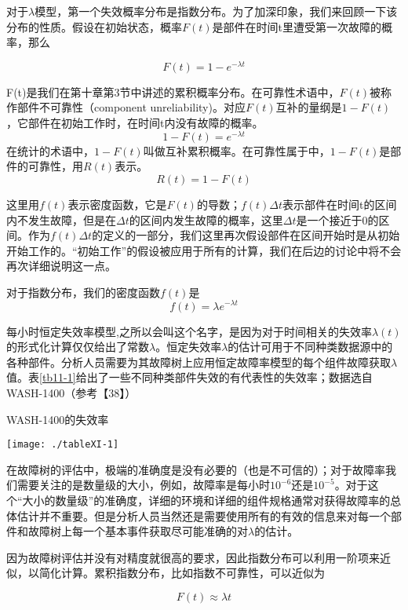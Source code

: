 \documentclass[cn,11pt,chinese]{elegantbook}
\begin{document}
{对于$\lambda$模型，第一个失效概率分布是指数分布。为了加深印象，我们来回顾一下该分布的性质。假设在初始状态，概率$F(t)$是部件在时间t里遭受第一次故障的概率，那么

\begin{equation}\label{eq11-1}
F(t)=1-e^{-\lambda t}
\end{equation}

F(t)是我们在第十章第3节中讲述的累积概率分布。在可靠性术语中，$F(t)$被称作部件不可靠性（component unreliability)。对应$F(t)$互补的量纲是$1-F(t)$，它部件在初始工作时，在时间t内没有故障的概率。
$$1-F(t)=e^{-\lambda t}$$
在统计的术语中，$1-F(t)$叫做互补累积概率。在可靠性属于中，$1-F(t)$是部件的可靠性，用$R(t)$表示。
$$R(t)=1-F(t)$$

这里用$f(t)$表示密度函数，它是$F(t)$的导数；$f(t)\Delta t$表示部件在时间t的区间内不发生故障，但是在$\Delta t$的区间内发生故障的概率，这里$\Delta t$是一个接近于0的区间。作为$f(t)\Delta t$的定义的一部分，我们这里再次假设部件在区间开始时是从初始开始工作的。“初始工作”的假设被应用于所有的计算，我们在后边的讨论中将不会再次详细说明这一点。

对于指数分布，我们的密度函数$f(t)$是
$$f(t)=\lambda e^{-\lambda t}$$

每小时恒定失效率模型,之所以会叫这个名字，是因为对于时间相关的失效率$\lambda(t)$的形式化计算仅仅给出了常数$\lambda$。恒定失效率$\lambda$的估计可用于不同种类数据源中的各种部件。分析人员需要为其故障树上应用恒定故障率模型的每个组件故障获取$\lambda$值。表\ref{tb11-1}给出了一些不同种类部件失效的有代表性的失效率；数据选自WASH-1400（参考【38】）

\begin{table}
	\caption{WASH-1400的失效率}\label{tb11-1}
	\texttt{[image: ./tableXI-1]}
\end{table}

在故障树的评估中，极端的准确度是没有必要的（也是不可信的）；对于故障率我们需要关注的是数量级的大小，例如，故障率是每小时$10^{-6}$还是$10^{-5}$。对于这个“大小的数量级”的准确度，详细的环境和详细的组件规格通常对获得故障率的总体估计并不重要。但是分析人员当然还是需要使用所有的有效的信息来对每一个部件和故障树上每一个基本事件获取尽可能准确的对$\lambda$的估计。

因为故障树评估并没有对精度就很高的要求，因此指数分布可以利用一阶项来近似，以简化计算。累积指数分布，比如指数不可靠性，可以近似为

\begin{equation}\label{eq11-5}
F(t) \approx \lambda t
\end{equation}

}
\end{document}
